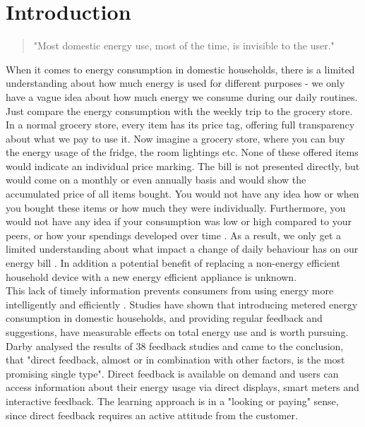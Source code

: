 
\chapter{Introduction}
\label{ch:Introduction}

\begin{quotation}
"Most domestic energy use, most of the time, is invisible to the user." 
\begin{flushright}
\cite{Darby2006}
\end{flushright}
\end{quotation}

When it comes to energy consumption in domestic households, there is a limited understanding about how much energy is used for different purposes - we only have a vague idea about how much energy we consume during our daily routines. Just compare the energy consumption with the weekly trip to the grocery store. In a normal grocery store, every item has its price tag, offering full transparency about what we pay to use it. Now imagine a grocery store, where you can buy the energy usage of the fridge, the room lightings etc. None of these offered items would indicate an individual price marking. The bill is not presented directly, but would come on a monthly or even annually basis and would show the accumulated price of all items bought. You would not have any idea how or when you bought these items or how much they were individually. Furthermore, you would not have any idea if your consumption was low or high compared to your peers, or how your spendings developed over time  \citep{Kempton1994}. As a result, we only get a limited understanding about what impact a change of daily behaviour has on our energy bill  \citep{Darby2006}. In addition a potential benefit of replacing a non-energy efficient household device with a new energy efficient appliance is unknown.\\
This lack of timely information prevents consumers from using energy more intelligently and efficiently \citep{Darby2000}.
Studies have shown that introducing metered energy consumption in domestic households, and providing regular feedback and suggestions, have measurable effects on total energy use and is worth pursuing.  
Darby analysed the results of 38 feedback studies and came to the conclusion, that "direct feedback, almost or in combination with other factors, is the most promising single type". Direct feedback is available on demand and users can access information about their energy usage via direct displays, smart meters and interactive feedback. The learning approach is in a "looking or paying" sense, since direct feedback requires an active attitude from the customer.
